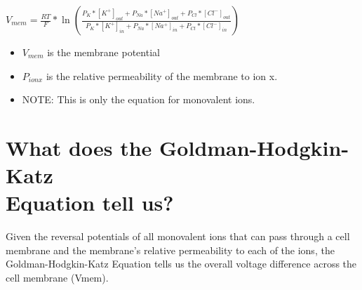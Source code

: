 \documentclass[a4paper,9pt]{extarticle}
\begin{document}
\begin{multicols*}{2}
$V_{mem} = \frac{RT}{F}*\ln(\frac{P_{K} * [K^+]_{out} + P_{Na} * [Na^+]_{out} + P_{Cl} * [Cl^-]_{out}}{P_{K}*[K^+]_{in} + P_{Na} * [Na^+]_{in} + P_{Cl} * [Cl^-]_{in}})$
\\
\begin{itemize}
\setlength\itemsep{.5em}
  \item $V_{mem}$ is the membrane potential
  \item $P_{ion x}$ is the relative permeability of the membrane to ion x.
  \item NOTE: This is only the equation for monovalent ions.
\end{itemize}


\section*{What does the Goldman-Hodgkin-Katz \\Equation tell us?}

Given the reversal potentials of all monovalent ions that can pass through a cell membrane and the membrane's relative permeability to each of the ions, the Goldman-Hodgkin-Katz Equation tells us the overall voltage difference across the cell membrane (Vmem).

\vfill\null
\columnbreak 

\end{multicols*}
\end{document}
